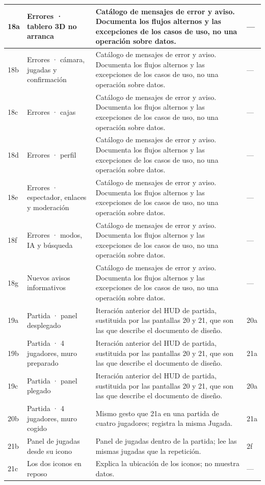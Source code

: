 \begin{center}
\begin{longtable}{|L{0.115\textwidth}|L{0.25\textwidth}|L{0.41\textwidth}|L{0.115\textwidth}|}
18a & Errores · tablero 3D no arranca & Catálogo de mensajes de error y aviso. Documenta los flujos alternos y las excepciones de los casos de uso, no una operación sobre datos. & — \\ \hline
18b & Errores · cámara, jugadas y confirmación & Catálogo de mensajes de error y aviso. Documenta los flujos alternos y las excepciones de los casos de uso, no una operación sobre datos. & — \\ \hline
18c & Errores · cajas & Catálogo de mensajes de error y aviso. Documenta los flujos alternos y las excepciones de los casos de uso, no una operación sobre datos. & — \\ \hline
18d & Errores · perfil & Catálogo de mensajes de error y aviso. Documenta los flujos alternos y las excepciones de los casos de uso, no una operación sobre datos. & — \\ \hline
18e & Errores · espectador, enlaces y moderación & Catálogo de mensajes de error y aviso. Documenta los flujos alternos y las excepciones de los casos de uso, no una operación sobre datos. & — \\ \hline
18f & Errores · modos, IA y búsqueda & Catálogo de mensajes de error y aviso. Documenta los flujos alternos y las excepciones de los casos de uso, no una operación sobre datos. & — \\ \hline
18g & Nuevos avisos informativos & Catálogo de mensajes de error y aviso. Documenta los flujos alternos y las excepciones de los casos de uso, no una operación sobre datos. & — \\ \hline
19a & Partida · panel desplegado & Iteración anterior del HUD de partida, sustituida por las pantallas 20 y 21, que son las que describe el documento de diseño. & 20a \\ \hline
19b & Partida · 4 jugadores, muro preparado & Iteración anterior del HUD de partida, sustituida por las pantallas 20 y 21, que son las que describe el documento de diseño. & 21a \\ \hline
19c & Partida · panel plegado & Iteración anterior del HUD de partida, sustituida por las pantallas 20 y 21, que son las que describe el documento de diseño. & 20a \\ \hline
20b & Partida · 4 jugadores, muro cogido & Mismo gesto que 21a en una partida de cuatro jugadores; registra la misma Jugada. & 21a \\ \hline
21b & Panel de jugadas desde su icono & Panel de jugadas dentro de la partida; lee las mismas jugadas que la repetición. & 2f \\ \hline
21c & Los dos iconos en reposo & Explica la ubicación de los iconos; no muestra datos. & — \\ \hline
\end{longtable}
\end{center}

